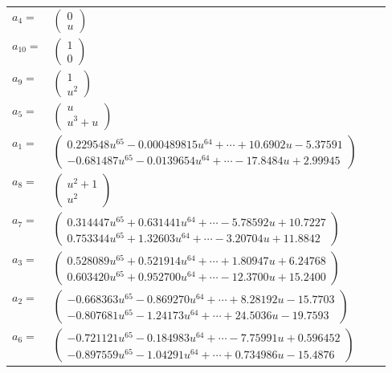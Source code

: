 \documentclass[1p]{elsarticle_modified}
\theoremstyle{definition}
\begin{document}
\begin{tabular}{m{7pt} m{180pt} m{7pt} m{180pt} }
\flushright $a_{4}=$&$\begin{pmatrix}0\\u\end{pmatrix}$ \\
\flushright $a_{10}=$&$\begin{pmatrix}1\\0\end{pmatrix}$ \\
\flushright $a_{9}=$&$\begin{pmatrix}1\\u^2\end{pmatrix}$ \\
\flushright $a_{5}=$&$\begin{pmatrix}u\\u^3+u\end{pmatrix}$ \\
\flushright $a_{1}=$&$\begin{pmatrix}0.229548 u^{65}-0.000489815 u^{64}+\cdots+10.6902 u-5.37591\\-0.681487 u^{65}-0.0139654 u^{64}+\cdots-17.8484 u+2.99945\end{pmatrix}$ \\
\flushright $a_{8}=$&$\begin{pmatrix}u^2+1\\u^2\end{pmatrix}$ \\
\flushright $a_{7}=$&$\begin{pmatrix}0.314447 u^{65}+0.631441 u^{64}+\cdots-5.78592 u+10.7227\\0.753344 u^{65}+1.32603 u^{64}+\cdots-3.20704 u+11.8842\end{pmatrix}$ \\
\flushright $a_{3}=$&$\begin{pmatrix}0.528089 u^{65}+0.521914 u^{64}+\cdots+1.80947 u+6.24768\\0.603420 u^{65}+0.952700 u^{64}+\cdots-12.3700 u+15.2400\end{pmatrix}$ \\
\flushright $a_{2}=$&$\begin{pmatrix}-0.668363 u^{65}-0.869270 u^{64}+\cdots+8.28192 u-15.7703\\-0.807681 u^{65}-1.24173 u^{64}+\cdots+24.5036 u-19.7593\end{pmatrix}$ \\
\flushright $a_{6}=$&$\begin{pmatrix}-0.721121 u^{65}-0.184983 u^{64}+\cdots-7.75991 u+0.596452\\-0.897559 u^{65}-1.04291 u^{64}+\cdots+0.734986 u-15.4876\end{pmatrix}$ \\

\end{tabular}
\end{document}
